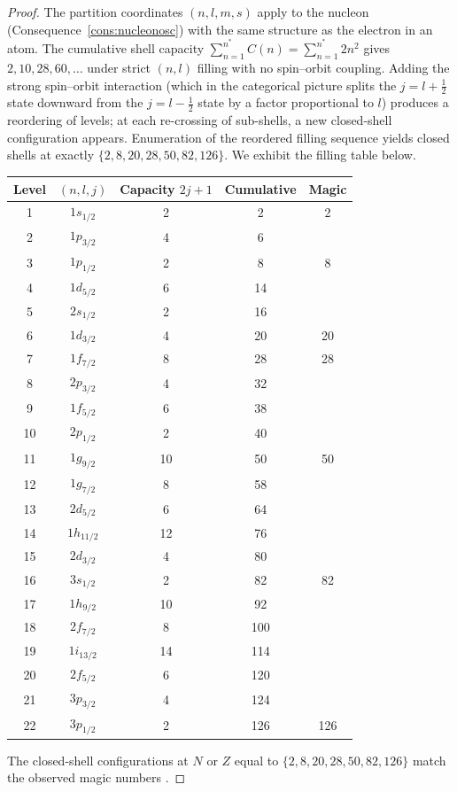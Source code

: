 \documentclass[11pt,twocolumn,a4paper]{article}
\theoremstyle{axiomstyle}
\theoremstyle{conseqstyle}
\theoremstyle{definition}
\theoremstyle{remark}
\begin{document}
\begin{proof}
The partition coordinates $(n,l,m,s)$ apply to the nucleon (Consequence~\ref{cons:nucleonosc}) with the same structure as the electron in an atom. The cumulative shell capacity $\sum_{n=1}^{n^{*}}C(n)=\sum_{n=1}^{n^{*}}2n^{2}$ gives $2,10,28,60,\ldots$ under strict $(n,l)$ filling with no spin--orbit coupling. Adding the strong spin--orbit interaction (which in the categorical picture splits the $j=l+\tfrac{1}{2}$ state downward from the $j=l-\tfrac{1}{2}$ state by a factor proportional to $l$) produces a reordering of levels; at each re-crossing of sub-shells, a new closed-shell configuration appears. Enumeration of the reordered filling sequence \citep{mayer1949,haxeljensensuess1949,bohrmottelson1969,krane1988} yields closed shells at exactly $\{2,8,20,28,50,82,126\}$. We exhibit the filling table below.

\begin{center}
\begin{tabular}{c|c|c|c|c}
\toprule
Level & $(n,l,j)$ & Capacity $2j+1$ & Cumulative & Magic\\
\midrule
1 & $1s_{1/2}$ & 2  & 2   & 2\\
2 & $1p_{3/2}$ & 4  & 6   & \\
3 & $1p_{1/2}$ & 2  & 8   & 8\\
4 & $1d_{5/2}$ & 6  & 14  & \\
5 & $2s_{1/2}$ & 2  & 16  & \\
6 & $1d_{3/2}$ & 4  & 20  & 20\\
7 & $1f_{7/2}$ & 8  & 28  & 28\\
8 & $2p_{3/2}$ & 4  & 32  & \\
9 & $1f_{5/2}$ & 6  & 38  & \\
10 & $2p_{1/2}$ & 2  & 40 & \\
11 & $1g_{9/2}$ & 10 & 50  & 50\\
12 & $1g_{7/2}$ & 8  & 58  & \\
13 & $2d_{5/2}$ & 6  & 64  & \\
14 & $1h_{11/2}$ & 12 & 76 & \\
15 & $2d_{3/2}$ & 4  & 80  & \\
16 & $3s_{1/2}$ & 2  & 82  & 82\\
17 & $1h_{9/2}$ & 10 & 92  & \\
18 & $2f_{7/2}$ & 8  & 100 & \\
19 & $1i_{13/2}$ & 14 & 114 & \\
20 & $2f_{5/2}$ & 6  & 120 & \\
21 & $3p_{3/2}$ & 4  & 124 & \\
22 & $3p_{1/2}$ & 2  & 126 & 126\\
\bottomrule
\end{tabular}
\end{center}

The closed-shell configurations at $N$ or $Z$ equal to $\{2,8,20,28,50,82,126\}$ match the observed magic numbers \citep{krane1988}.
\end{proof}
\end{document}
